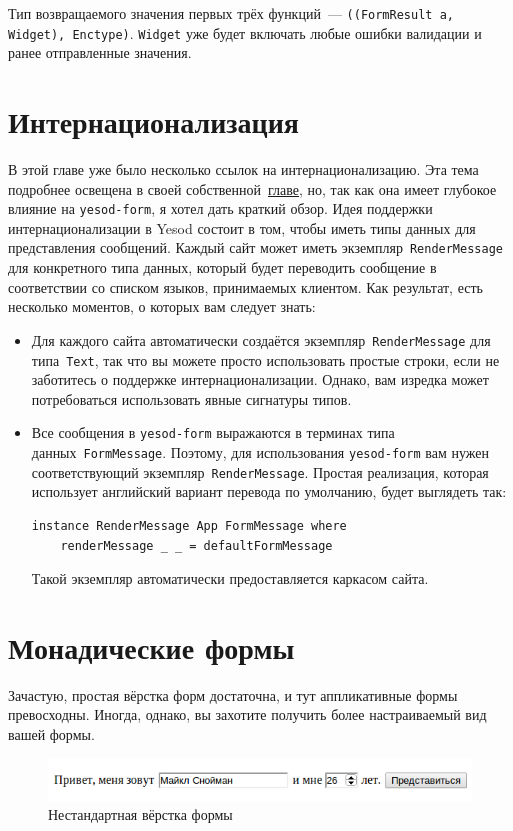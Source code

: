 Тип возвращаемого значения первых трёх функций~---
\lstinline'((FormResult a, Widget), Enctype)'.  \lstinline'Widget' уже будет
включать любые ошибки валидации и ранее отправленные значения.

\section{Интернационализация}
В этой главе уже было несколько ссылок на интернационализацию. Эта тема
подробнее освещена в своей собственной~\hyperref[chap:i18n]{главе}, но, так как
она имеет глубокое влияние на \lstinline'yesod-form', я хотел дать краткий обзор.
Идея поддержки интернационализации в Yesod состоит в том, чтобы иметь
типы данных для представления сообщений. Каждый сайт может иметь
экземпляр~\lstinline'RenderMessage' для конкретного типа данных, который будет
переводить сообщение в соответствии со списком языков, принимаемых клиентом.
Как результат, есть несколько моментов, о которых вам следует знать:
\begin{itemize}
    \item  Для каждого сайта автоматически создаётся
        экземпляр~\lstinline'RenderMessage' для типа~\lstinline'Text', так что
        вы можете просто использовать простые строки, если не заботитесь о
        поддержке интернационализации. Однако, вам изредка может потребоваться
        использовать явные сигнатуры типов.

    \item Все сообщения в \lstinline'yesod-form' выражаются в терминах типа
        данных~\lstinline'FormMessage'.  Поэтому, для использования \lstinline'yesod-form'
        вам нужен соответствующий экземпляр~\lstinline'RenderMessage'. Простая
        реализация, которая использует английский вариант перевода по
        умолчанию, будет выглядеть так:
\begin{lstlisting}
instance RenderMessage App FormMessage where
    renderMessage _ _ = defaultFormMessage
\end{lstlisting}
        Такой экземпляр автоматически предоставляется каркасом сайта.
\end{itemize}

\section{Монадические формы}
Зачастую, простая вёрстка форм достаточна, и тут аппликативные формы
превосходны. Иногда, однако, вы захотите получить более настраиваемый вид вашей
формы.
\begin{figure}[tbph]
  \centering
  \includegraphics[width=\textwidth]{forms/image.png}
  \caption{Нестандартная вёрстка формы}
\end{figure}

